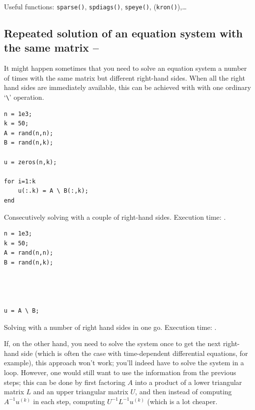 
\Pointinghand\hspace{1em} Useful functions: \lstinline!sparse()!, \lstinline!spdiags()!, \lstinline!speye()!, (\lstinline!kron()!),\dots



\subsection{Repeated solution of an equation system with the same matrix -- \fastsymbol\fastsymbol\fastsymbol\fastsymbol\fastsymbol}

It might happen sometimes that you need to solve an equation system a number of times with the same matrix but different right-hand sides. When all the right hand sides are immediately available, this can be achieved with with one ordinary `\lstinline!\!' operation.

\hfill
\begin{minipage}[t]{.45\textwidth}
\begin{lstlisting}[framerule=2pt,rulecolor=\color{badred}]
n = 1e3;
k = 50;
A = rand(n,n);
B = rand(n,k);

u = zeros(n,k);

for i=1:k
    u(:.k) = A \ B(:,k);
end
\end{lstlisting}
Consecutively solving with a couple of right-hand sides. Execution time: .
\end{minipage}
\hfill
\begin{minipage}[t]{.45\textwidth}
\begin{lstlisting}[framerule=2pt,rulecolor=\color{goodgreen}]
n = 1e3;
k = 50;
A = rand(n,n);
B = rand(n,k);




u = A \ B;

\end{lstlisting}
Solving with a number of right hand sides in one go. Execution time: .
\end{minipage}
\hfill


If, on the other hand, you need to solve the system once to get the next right-hand side (which is often the case with time-dependent differential equations, for example), this approach won't work; you'll indeed have to solve the system in a loop. However, one would still want to use the information from the previous steps; this can be done by first factoring $A$ into a product of a lower triangular matrix $L$ and an upper triangular matrix $U$, and then instead of computing $A^{-1}u^{(k)}$ in each step, computing $U^{-1}L^{-1}u^{(k)}$ (which is a lot cheaper.

